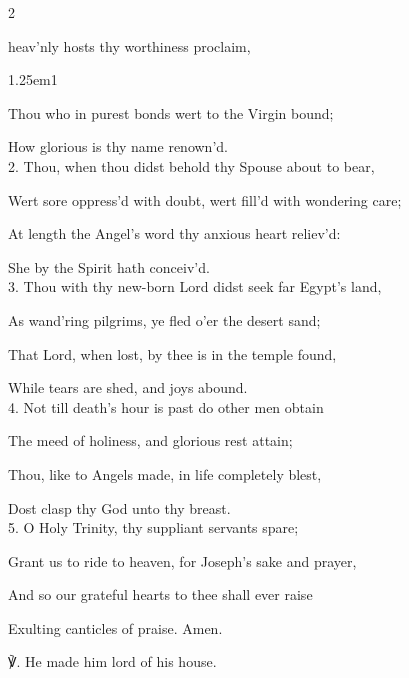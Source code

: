 \begin{paracol}{2}
	


\firstEvensong
{}

\firstEvensongHymn\label{JosephEvensong}

 heav'nly hosts thy worthiness proclaim,

\begin{hangparas}{1.25em}{1}
	
Thou who in purest bonds wert to the Virgin bound;

How glorious is thy name renown'd.\\

2. Thou, when thou didst behold thy Spouse about to bear,

Wert sore oppress'd with doubt, wert fill'd with wondering care;

At length the Angel's word thy anxious heart reliev'd:

She by the Spirit hath conceiv'd.\\

3. Thou with thy new-born Lord didst seek far Egypt's land,

As wand'ring pilgrims, ye fled o'er the desert sand;

That Lord, when lost, by thee is in the temple found,

While tears are shed, and joys abound.\\

4. Not till death's hour is past do other men obtain

The meed of holiness, and glorious rest attain;

Thou, like to Angels made, in life completely blest,

Dost clasp thy God unto thy breast.\\

5. O Holy Trinity, thy suppliant servants spare;

Grant us to ride to heaven, for Joseph's sake and prayer,

And so our grateful hearts to thee shall ever raise

Exulting canticles of praise. Amen.\\
\end{hangparas}

    ℣. He made him lord of his house.


\end{paracol}
